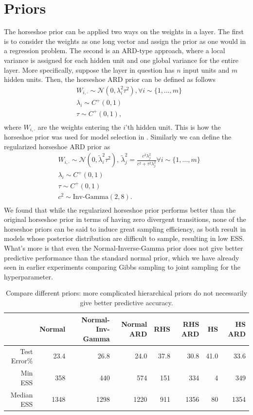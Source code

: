\documentclass[12pt]{report}
\begin{document}
\section{Priors}

The horseshoe prior can be applied two ways on the weights in a layer. The first is to consider the weights as one long vector and assign the prior as one would in a regression problem. The second is an ARD-type approach, where a local variance is assigned for each hidden unit and one global variance for the entire layer. More specifically, suppose the layer in question has $n$ input units and $m$ hidden units. Then, the horseshoe ARD prior can be defined as follows 
\begin{align*}
& W_{i,\cdot} \sim \mathcal{N}(0,\lambda_i^2\tau^2) , \forall i \sim \{1,\dots, m \} \\
& \lambda_i \sim C^+(0,1) \\
& \tau \sim C^+(0,1), \\
\end{align*}
where $ W_{i,\cdot}  $ are the weights entering the $i$'th hidden unit. This is how the horseshoe prior was used for model selection in \cite{ghosh2017model}. Similarly we can define the regularized horseshoe ARD prior as 
\begin{align*}
& W_{i,\cdot} \sim \mathcal{N}(0,\tilde{\lambda}_i^2\tau^2) , \, \tilde{\lambda}_j^2 = \frac{c^2 \lambda_j^2}{c^2 + \tau^2 \lambda_j^2}  \forall i \sim \{1,\dots, m \} \\
& \lambda_i \sim C^+(0,1) \\
& \tau \sim C^+(0,1) \\
&c^2 \sim \text{Inv-Gamma}(2,8).\\
\end{align*}
We found that while the regularized horseshoe prior performs better than the original horseshoe prior in terms of having zero divergent transitions, none of the horseshoe priors can be said to induce great sampling efficiency, as both result in models whose posterior distribution are difficult to sample, resulting in low ESS. What's more is that even the Normal-Inverse-Gamma prior does not give better predictive performance than the standard normal prior, which we have already seen in earlier experiments comparing Gibbs sampling to joint sampling for the hyperparameter. 
\begin{table}[]
\centering
\begin{tabular}{@{}rrrrrrrr@{}}
\toprule
              & Normal & Normal-Inv-Gamma & Normal ARD     & RHS     & RHS ARD & HS  & HS ARD \\ \midrule
Test Error$\%$    & 23.4    & 26.8    & 24.0& 37.8    & 30.8      & 41.0       & 33.6               \\ \midrule
Min ESS       & 358      & 440   & 574  & 151  & 334     & 4       & 349              \\ \midrule
Median ESS    & 1348      & 1298  & 1220  & 911 & 1356     & 80      & 1354             \\ \midrule
\end{tabular}
\caption{Compare different priors: more complicated hierarchical priors do not necessarily give better predictive accuracy.}
\label{my-label}
\end{table}
\end{document}
